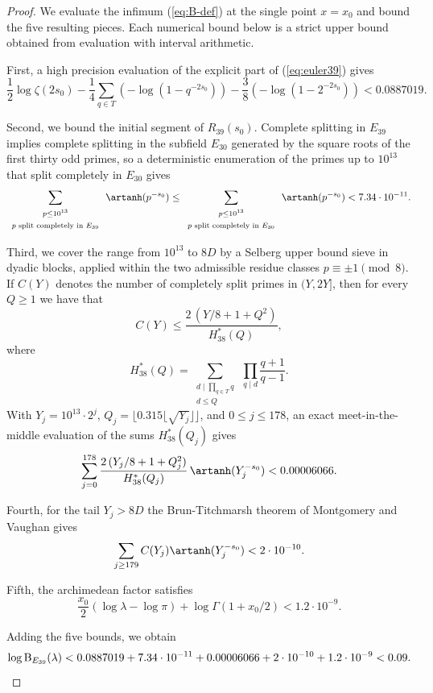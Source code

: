 \begin{proof}
We evaluate the infimum (\ref{eq:B-def}) at the single point $x=x_0$ and bound the five resulting pieces.  Each numerical bound below is a strict upper bound obtained from evaluation with interval arithmetic.

First, a high precision evaluation of the explicit part of (\ref{eq:euler39}) gives
\[
   \frac12\log\zeta(2s_0)
   -\frac14\sum_{q\in T}\left(-\log(1-q^{-2s_0})\right)
   -\frac38\left(-\log(1-2^{-2s_0})\right)
   <0.0887019.
\]

Second, we bound the initial segment of $R_{39}(s_0)$.  Complete splitting in $E_{39}$ implies complete splitting in the subfield $E_{30}$ generated by the square roots of the first thirty odd primes, so a deterministic enumeration of the primes up to $10^{13}$ that split completely in $E_{30}$ gives
\[
   \sum_{\begin{array}{c}
      \scriptstyle p\leq10^{13}\\
      \scriptstyle p\text{ split completely in }E_{39}
   \end{array}}\artanh(p^{-s_0})
   \leq
   \sum_{\begin{array}{c}
      \scriptstyle p\leq10^{13}\\
      \scriptstyle p\text{ split completely in }E_{30}
   \end{array}}\artanh(p^{-s_0})
   <7.34\cdot10^{-11}.
\]

Third, we cover the range from $10^{13}$ to $8D$ by a Selberg upper bound sieve \cite{HalberstamRichert,IwaniecKowalski} in dyadic blocks, applied within the two admissible residue classes $p\equiv\pm1\pmod{8}$.  If $C(Y)$ denotes the number of completely split primes in $(Y,2Y]$, then for every $Q\geq1$ we have that
\[
   C(Y)\leq \frac{2\,(Y/8+1+Q^2)}{H_{38}^*(Q)},
\]
where
\[
   H_{38}^*(Q)=\sum_{\begin{array}{c}
      \scriptstyle d\mid\prod_{q\in T}q\\
      \scriptstyle d\leq Q
   \end{array}}\ \prod_{q\mid d}\frac{q+1}{q-1}.
\]
With $Y_j=10^{13}\cdot2^j$, $Q_j=\lfloor0.315\lfloor\sqrt{Y_j}\rfloor\rfloor$, and $0\leq j\leq178$, an exact meet-in-the-middle evaluation of the sums $H_{38}^*(Q_j)$ gives
\[
   \sum_{j=0}^{178}
   \frac{2\,(Y_j/8+1+Q_j^2)}{H_{38}^*(Q_j)}\,
   \artanh(Y_j^{-s_0})<0.00006066.
\]

Fourth, for the tail $Y_j>8D$ the Brun-Titchmarsh theorem of Montgomery and Vaughan \cite{MontgomeryVaughan} gives
\[
   \sum_{j\geq179} C(Y_j)\artanh(Y_j^{-s_0})<2\cdot10^{-10}.
\]

Fifth, the archimedean factor satisfies
\[
   \frac{x_0}{2}(\log\lambda-\log\pi)+\log\Gamma(1+x_0/2)<1.2\cdot10^{-9}.
\]

Adding the five bounds, we obtain
\[
   \log \mathrm{B}_{E_{39}}(\lambda)
   <0.0887019+7.34\cdot10^{-11}+0.00006066+2\cdot10^{-10}+1.2\cdot10^{-9}
   <0.09.
   \qedhere
\]
\end{proof}

